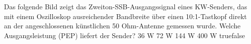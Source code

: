     {Das folgende Bild zeigt das Zweiton-SSB-Ausgangssignal eines KW-Senders, das mit einem Oszilloskop ausreichender Bandbreite über einen 10:1-Tastkopf direkt an der angeschlossenen künstlichen 50 Ohm-Antenne gemessen wurde. Welche Ausgangsleistung (PEP) liefert der Sender?}
    {36 W}
    {72 W}
    {144 W}
    {400 W}
    {true}{false}